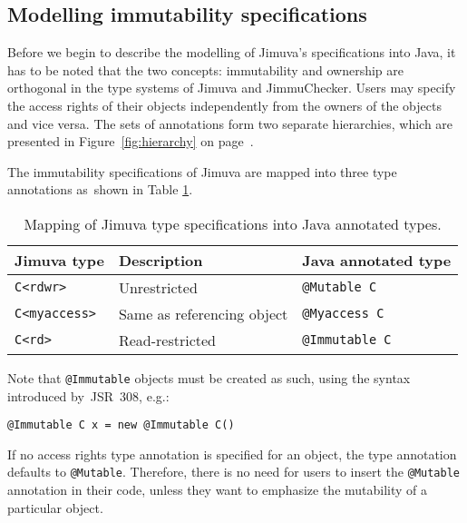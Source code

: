 \documentclass{pracamgr}
\theoremstyle{break}
\theoremstyle{break}
\theoremstyle{break}
\begin{document}
\subsection{Modelling immutability specifications}

Before we begin to describe the modelling of Jimuva's specifications
into Java, it has to be noted that the two concepts: immutability and
ownership are orthogonal in the type systems of Jimuva and
JimmuChecker. Users may specify the access rights of their objects
independently from the owners of the objects and vice versa. The sets
of annotations form two separate hierarchies, which are presented in
Figure~\ref{fig:hierarchy} on page~\pageref{fig:hierarchy}.

The immutability specifications of Jimuva are mapped into three type
annotations as~shown in Table \ref{tab:mapping-immut}.

\begin{table}[htb]
  \centering
  \begin{tabular}{|l|l|l|}
    \hline
    \textbf{Jimuva type} & \textbf{Description} & \textbf{Java annotated type} \\
    \hline \hline
    \texttt{C<rdwr>} & Unrestricted & \texttt{@Mutable C} \\
    \texttt{C<myaccess>} & Same as referencing object & \texttt{@Myaccess C} \\
    \texttt{C<rd>} & Read-restricted & \texttt{@Immutable C} \\
    \hline
  \end{tabular}
  \caption{Mapping of Jimuva type specifications into Java annotated types.}
  \label{tab:mapping-immut}
\end{table}

Note that \texttt{@Immutable} objects must be created as such, using
the syntax introduced by~JSR~308, e.g.:
\begin{center}
  \texttt{@Immutable C x = new @Immutable C()}
\end{center}

If no access rights type annotation is specified for an object, the
type annotation defaults to \texttt{@Mutable}. Therefore, there is
no need for users to insert the \texttt{@Mutable} annotation in their
code, unless they want to emphasize the mutability of a particular
object.
\end{document}
